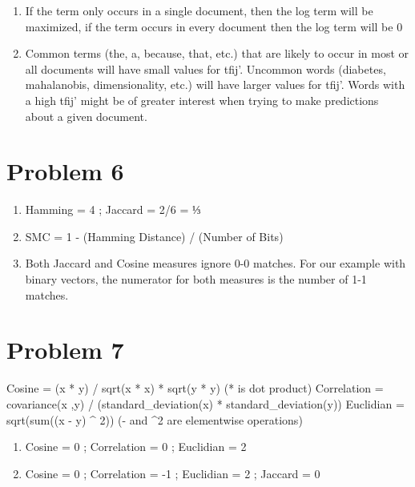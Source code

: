 \documentclass[]{article}
\providecommand{\tightlist}{%
  \setlength{\itemsep}{0pt}\setlength{\parskip}{0pt}}
\begin{document}
\begin{enumerate}
\def\labelenumi{\alph{enumi})}
\item
  If the term only occurs in a single document, then the log term will
  be maximized, if the term occurs in every document then the log term
  will be 0
\item
  Common terms (the, a, because, that, etc.) that are likely to occur in
  most or all documents will have small values for tfij'. Uncommon words
  (diabetes, mahalanobis, dimensionality, etc.) will have larger values
  for tfij'. Words with a high tfij' might be of greater interest when
  trying to make predictions about a given document.
\end{enumerate}

\section{Problem 6}\label{problem-6}

\begin{enumerate}
\def\labelenumi{\alph{enumi})}
\tightlist
\item
  Hamming = 4 ; Jaccard = 2/6 = ⅓
\item
  SMC = 1 - (Hamming Distance) / (Number of Bits)
\item
  Both Jaccard and Cosine measures ignore 0-0 matches. For our example
  with binary vectors, the numerator for both measures is the number of
  1-1 matches.
\end{enumerate}

\section{Problem 7}\label{problem-7}

Cosine = (x * y) / sqrt(x * x) * sqrt(y * y) (* is dot product)
Correlation = covariance(x ,y) / (standard\_deviation(x) *
standard\_deviation(y)) Euclidian = sqrt(sum((x - y) \^{} 2)) (- and
\^{}2 are elementwise operations)

\begin{enumerate}
\def\labelenumi{\alph{enumi})}
\tightlist
\item
  Cosine = 0 ; Correlation = 0 ; Euclidian = 2
\item
  Cosine = 0 ; Correlation = -1 ; Euclidian = 2 ; Jaccard = 0
\end{enumerate}
\end{document}
